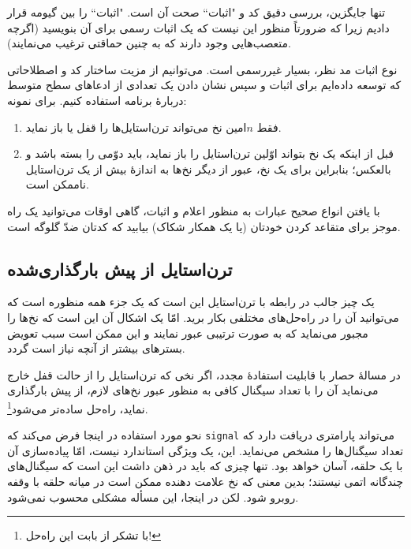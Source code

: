 \documentclass{book}
\newcommand{\clearemptydoublepage}{\newpage\cleardoublepage}
\begin{document}
    تنها جایگزین، بررسی دقیق کد و "اثبات`` صحت آن است. "اثبات`` را بین گیومه قرار دادیم زیرا که ضرورتاً منظور این نیست که یک اثبات 
    رسمی برای آن بنویسید (اگرچه متعصب‌هایی وجود دارند که به چنین حماقتی  ترغیب می‌نمایند).

نوع اثبات مد نظر، بسیار غیررسمی است. می‌توانیم از مزیت ساختار کد و اصطلاحاتی که توسعه داده‌ایم برای اثبات و سپس نشان دادن 
یک تعدادی از ادعاهای سطح متوسط دربارهٔ برنامه استفاده کنیم. برای نمونه:


    
\begin{enumerate}

\item 
    فقط $n$امین نخ می‌تواند ترن‌استایل‌ها را قفل یا باز نماید. 

\item 
    قبل از اینکه یک نخ بتواند اوّلین ترن‌استایل را باز نماید، باید دوّمی را بسته باشد و بالعکس؛‌ بنابراین برای یک نخ، عبور از دیگر نخ‌ها به اندازهٔ بیش از 
    یک تر‌ن‌استایل ناممکن است. 

\end{enumerate}

    با یافتن انواع صحیح عبارات به منظور اعلام و اثبات، گاهی اوقات می‌توانید یک راه موجز برای متقاعد کردن خودتان  (یا یک همکار 
    شکاک) بیابید که کدتان ضدّ  گلوگه است. 
    

\clearemptydoublepage
\subsection { ترن‌استایل از پیش بارگذاری‌شده}

    یک چیز جالب در رابطه با ترن‌استایل این است که یک جزء همه منظوره است که می‌توانید آن را در راه‌حل‌های مختلفی بکار برید. 
    امّا یک اشکال آن این است که نخ‌ها را مجبور می‌نماید که به صورت ترتیبی عبور نمایند و این ممکن است سبب 
    تعویض بسترهای بیشتر از آنچه نیاز است گردد.

    در مسالهٔ حصار با قابلیت استفادهٔ مجدد، اگر نخی که ترن‌استایل را از حالت قفل خارج می‌نماید 
    آن را با تعداد سیگنال کافی به منظور عبور نخ‌های لازم، از پیش بارگذاری نماید، راه‌حل ساده‌تر می‌شود\footnote{با تشکر از  بابت این راه‌حل!}. 

    نحو مورد استفاده در اینجا فرض می‌کند که \texttt{signal} می‌تواند پارامتری دریافت دارد که تعداد سیگنال‌ها را مشخص می‌نماید. 
    این، یک ویژگی استاندارد نیست، امّا پیاده‌سازی آن با یک حلقه، آسان خواهد بود. تنها چیزی که باید در ذهن داشت این است که سیگنال‌های چندگانه 
    اتمی نیستند؛ بدین معنی که نخ علامت دهنده ممکن است در میانه حلقه با وقفه روبرو شود. لکن در اینجا، این مسأله مشکلی محسوب نمی‌شود.
\end{document}
